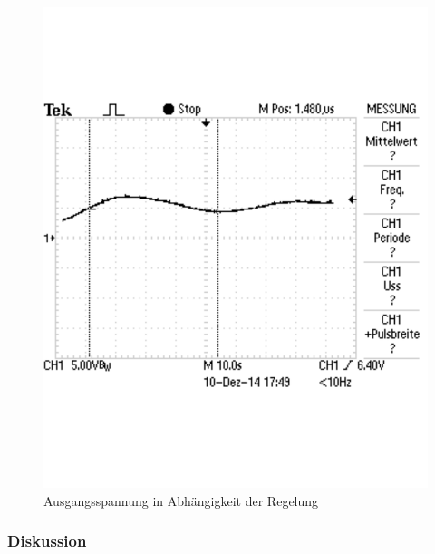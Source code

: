 \documentclass[12pt,a4paper]{article}
\begin{document}
\begin{figure}[H] 
  \centering
    \includegraphics[trim = 0mm 50mm 0mm 50mm, clip, scale = 0.6]{TEK0010.pdf}
  	\caption[Ausgangsspannung in Abhängigkeit der Regelung]{Ausgangsspannung in Abhängigkeit der Regelung}
  \label{fig:aus_3_4_4}
\end{figure}
\subsubsection*{Diskussion}
\end{document}
